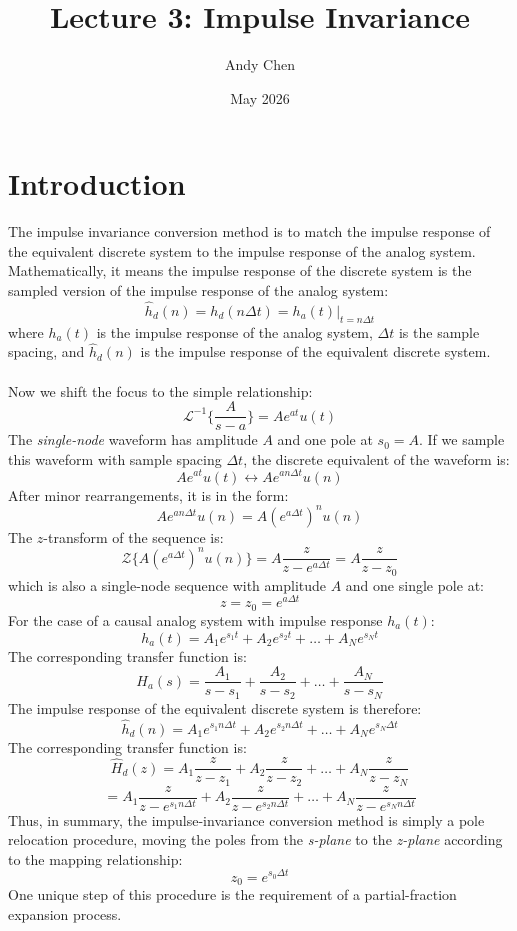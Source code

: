\documentclass{article}
\title{Lecture 3: Impulse Invariance}
\author{Andy Chen}
\date{May 2026}
\begin{document}
\maketitle

\section{Introduction}
The impulse invariance conversion method is to match the impulse response of the equivalent discrete system to the impulse response of the analog system. Mathematically, it means the impulse response of the discrete system is the sampled version of the impulse response of the analog system:
\[
\hat{h}_d(n)=h_d(n\Delta t)=h_a(t)|_{t=n\Delta t}
\]
where \(h_a(t)\) is the impulse response of the analog system, \(\Delta t\) is the sample spacing, and \(\hat{h}_d(n)\) is the impulse response of the equivalent discrete system. 
\\
\\
Now we shift the focus to the simple relationship:
\[
\mathcal{L}^{-1}\bigg\{\frac{A}{s-a}\bigg\} = Ae^{at} u(t)
\]
The \textit{single-node} waveform has amplitude \(A\) and one pole at \(s_0=A\). If we sample this waveform with sample spacing \(\Delta t\), the discrete equivalent of the waveform is:
\[
Ae^{at}u(t) \longleftrightarrow Ae^{an\Delta t}u(n) 
\]
After minor rearrangements, it is in the form:
\[
Ae^{an\Delta t}u(n) = A(e^{a\Delta t})^nu(n)
\]
The \(z\)-transform of the sequence is:
\[
\mathcal{Z}\{A(e^{a\Delta t})^nu(n)\} = A\frac{z}{z-e^{a\Delta t}} = A\frac{z}{z-z_0}
\]
which is also a single-node sequence with amplitude \(A\) and one single pole at:
\[
z=z_0=e^{a\Delta t}
\]
For the case of a causal analog system with impulse response \(h_a(t)\):
\[
h_a(t)=A_1e^{s_1t}+A_2e^{s_2t}+\dots+A_Ne^{s_Nt}
\]
The corresponding transfer function is:
\[
H_a(s)=\frac{A_1}{s-s_1}+\frac{A_2}{s-s_2}+\dots+\frac{A_N}{s-s_N}
\]
The impulse response of the equivalent discrete system is therefore:
\[
\hat{h}_d(n)=A_1e^{s_1n\Delta t}+A_2e^{s_2n\Delta t}+\dots+A_Ne^{s_N\Delta t}
\]
The corresponding transfer function is:
\[
\hat{H}_d(z)=A_1\frac{z}{z-z_1}+A_2\frac{z}{z-z_2}+\dots+A_N\frac{z}{z-z_N}
\]
\[
=A_1\frac{z}{z-e^{s_1n\Delta t}}+A_2\frac{z}{z-e^{s_2n\Delta t}}+\dots+A_N\frac{z}{z-e^{s_Nn\Delta t}}
\]
Thus, in summary, the impulse-invariance conversion method is simply a pole relocation procedure, moving the poles from the \textit{s-plane} to the \textit{z-plane} according to the mapping relationship:
\[
z_0=e^{s_0\Delta t}
\]
One unique step of this procedure is the requirement of a partial-fraction expansion process.
\end{document}
